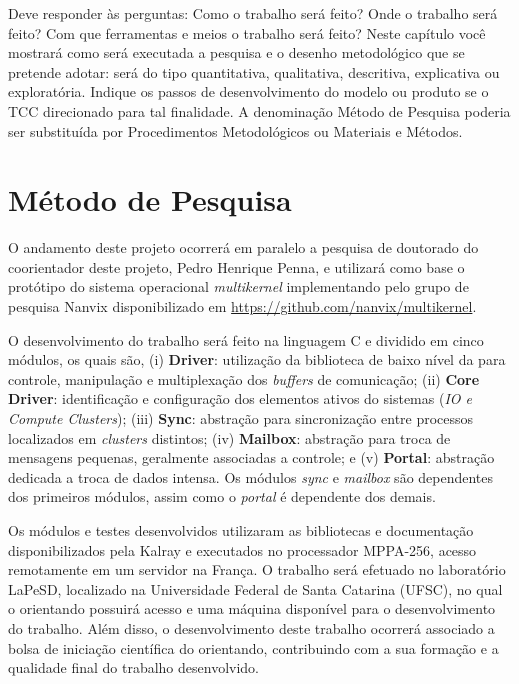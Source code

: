 \documentclass[
	12pt,				%
	openright,			%
	twoside,			%
	a4paper,			%
	english,			%
	brazil,				%
	]{abntex2}
\begin{document}
Deve responder às perguntas: Como o trabalho será feito? Onde o trabalho será feito?
Com que ferramentas e meios o trabalho será feito?
Neste capítulo você mostrará como será executada a pesquisa e o desenho
metodológico que se pretende adotar: será do tipo quantitativa, qualitativa, descritiva,
explicativa ou exploratória.
Indique os passos de desenvolvimento do modelo ou produto se o TCC direcionado
para tal finalidade. A denominação Método de Pesquisa poderia ser substituída por
Procedimentos Metodológicos ou Materiais e Métodos.

\section{Método de Pesquisa}
 O andamento deste projeto ocorrerá em paralelo a pesquisa de doutorado do coorientador deste projeto, Pedro Henrique Penna, e utilizará como base o protótipo do sistema operacional \textit{multikernel} implementando pelo grupo de pesquisa Nanvix \cite{Penna2017,Penna2017-1} disponibilizado em \url{https://github.com/nanvix/multikernel}.

O desenvolvimento do trabalho será feito na linguagem C e dividido em cinco módulos, os quais são,
(i) \textbf{\noc Driver}: utilização da biblioteca de baixo nível da \noc para controle, manipulação e multiplexação dos \textit{buffers} de comunicação;
(ii) \textbf{Core Driver}: identificação e configuração dos elementos ativos do sistemas (\textit{IO e Compute Clusters}); 
(iii) \textbf{Sync}: abstração para sincronização entre processos localizados em \textit{clusters} distintos;
(iv) \textbf{Mailbox}: abstração para troca de mensagens pequenas, geralmente associadas a controle; e 
(v) \textbf{Portal}: abstração dedicada a troca de dados intensa. Os módulos \textit{sync} e \textit{mailbox} são dependentes dos primeiros módulos, assim como o \textit{portal} é dependente dos demais.

Os módulos e testes desenvolvidos utilizaram as bibliotecas e documentação disponibilizados pela Kalray e executados no processador MPPA-256, acesso remotamente em um servidor na França. O trabalho será efetuado no laboratório LaPeSD, localizado na Universidade Federal de Santa Catarina (UFSC), no qual o orientando possuirá acesso e uma máquina disponível para o desenvolvimento do trabalho. Além disso, o desenvolvimento deste trabalho ocorrerá associado a bolsa de iniciação científica do orientando, contribuindo com a sua formação e a qualidade final do trabalho desenvolvido.
\end{document}
